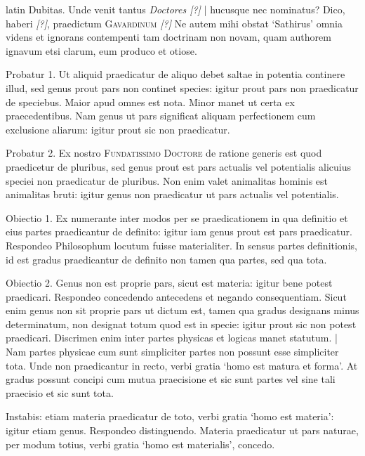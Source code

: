 \begin{otherlanguage*}{latin}
\pstart
 Dubitas. Unde venit tantus \emph{Doctores [?]} \textnormal{|} hucusque nec nominatus? Dico, haberi  \emph{ [?]}, praedictum \textsc{Gavardinum} \emph{ [?]} Ne autem mihi obstat `Sathirus' omnia videns et ignorans contempenti tam doctrinam non novam, quam authorem ignavum etsi clarum, eum produco et otiose. 
\pend

\pstart
 Probatur 1. Ut aliquid praedicatur de aliquo debet saltae in potentia continere illud, sed genus prout pars non continet species: igitur prout pars non praedicatur de speciebus. Maior apud omnes est nota. Minor manet ut certa ex praecedentibus. Nam genus ut pars significat aliquam perfectionem cum exclusione aliarum: igitur prout sic non praedicatur. 
\pend

\pstart
 Probatur 2. Ex nostro \textsc{Fundatissimo Doctore} de ratione generis est quod praedicetur de pluribus, sed genus prout est pars actualis vel potentialis alicuius speciei non praedicatur de pluribus. Non enim valet animalitas hominis est animalitas bruti: igitur genus non praedicatur ut pars actualis vel potentialis. 
\pend

\pstart
 Obiectio 1. Ex  numerante inter modos per se praedicationem in qua definitio et eius partes praedicantur de definito: igitur iam genus prout est pars praedicatur. Respondeo Philosophum locutum fuisse materialiter. In sensus partes definitionis, id est gradus praedicantur de definito non tamen qua partes, sed qua tota. 
\pend

\pstart
 Obiectio 2. Genus non est proprie pars, sicut est materia: igitur bene potest praedicari. Respondeo concedendo antecedens et negando consequentiam. Sicut enim genus non sit proprie pars ut dictum est, tamen qua gradus designans minus determinatum, non designat totum quod est in specie: igitur prout sic non potest praedicari. Discrimen enim inter partes physicas et logicas manet statutum. \textnormal{|}    Nam partes physicae cum sunt simpliciter partes non possunt esse simpliciter tota. Unde non praedicantur in recto, verbi gratia `homo est matura et forma'. At gradus possunt concipi cum mutua praecisione et sic sunt partes vel sine tali praecisio et sic sunt tota. 
\pend

\pstart
 Instabis: etiam materia praedicatur de toto, verbi gratia `homo est materia': igitur etiam genus. Respondeo distinguendo. Materia praedicatur ut pars naturae, per modum totius, verbi gratia `homo est materialis', concedo. 
\pend


\end{otherlanguage*}
